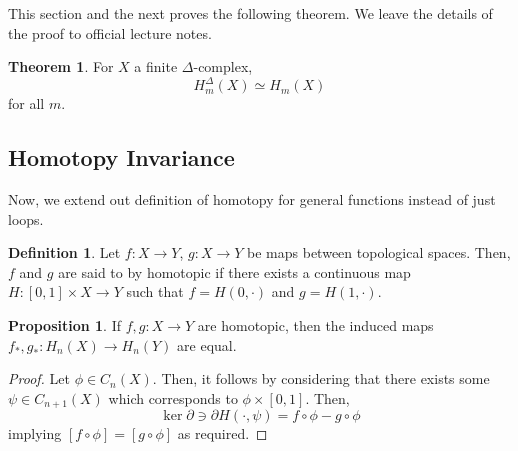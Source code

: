 \documentclass[]{article}
\theoremstyle{definition}
\newtheorem{theorem}{Theorem}
\theoremstyle{definition}
\newtheorem{definition}{Definition}[section]
\newtheorem{proposition}{Proposition}[section]
\begin{document}
This section and the next proves the following theorem. We leave the details 
of the proof to official lecture notes.

\begin{theorem}
  For \(X\) a finite \(\Delta\)-complex, 
  \[H_m^\Delta(X) \simeq H_m(X)\]
  for all \(m\).
\end{theorem}

\subsection{Homotopy Invariance}

Now, we extend out definition of homotopy for general functions instead of 
just loops.

\begin{definition}
  Let \(f : X \to Y\), \(g : X \to Y\) be maps between topological spaces. 
  Then, \(f\) and \(g\) are said to by homotopic if there exists a continuous 
  map \(H : [0, 1] \times X \to Y\) such that \(f = H(0, \cdot)\) and 
  \(g = H(1, \cdot)\).
\end{definition}

\begin{proposition}
  If \(f, g : X \to Y\) are homotopic, then the induced maps 
  \(f_*, g_* : H_n(X) \to H_n(Y)\) are equal. 
\end{proposition}
\begin{proof}
  Let \(\phi \in C_n(X)\). Then, it follows by considering that there exists some 
  \(\psi \in C_{n + 1}(X)\) which corresponds to \(\phi \times [0, 1]\). Then, 
  \[\ker \partial \ni \partial H(\cdot, \psi) = f \circ \phi - g \circ \phi\]
  implying \([f \circ \phi] = [g \circ \phi]\) as required.
\end{proof}
\end{document}
